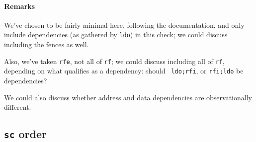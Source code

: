 \documentclass[a4paper]{article}
\begin{document}
\paragraph{Remarks} We've chosen to be fairly minimal here, following the
documentation, and only include dependencies (as gathered by {\tt ldo}) in this
check; we could discuss including the fences as well.

%

Also, we've taken {\tt rfe}, not all of {\tt rf}; we could discuss including
all of {\tt rf}, depending on what qualifies as a dependency: should {\tt
ldo;rfi}, or {\tt rfi;ldo} be dependencies? 
%
%

We could also discuss whether address and data dependencies are
observationally different.

%

\subsection{{\tt sc} order}
\end{document}
